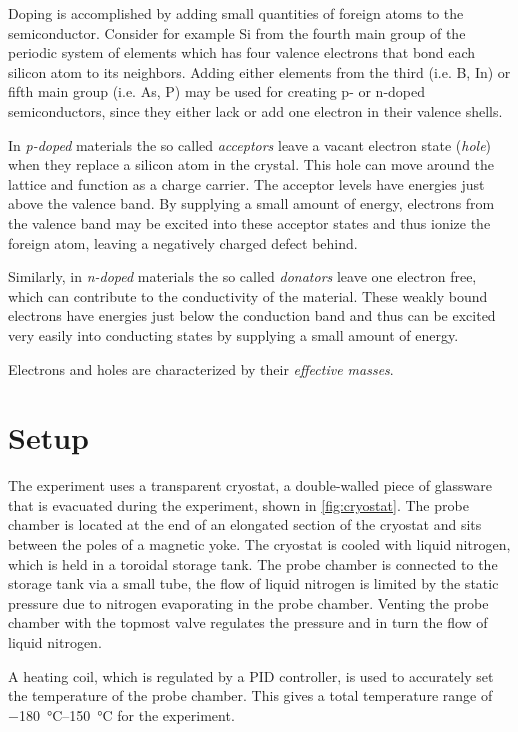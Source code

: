 Doping is accomplished by adding small quantities of foreign atoms to the semiconductor.
Consider for example Si from the fourth main group of the periodic system of elements which has four valence electrons that bond each silicon atom to its neighbors.
Adding either elements from the third (i.e. B, In) or fifth main group (i.e. As, P) may be used for creating p- or n-doped semiconductors, since they either lack or add one electron in their valence shells.

In \textit{p-doped} materials the so called \textit{acceptors} leave a vacant electron state (\textit{hole}) when they replace a silicon atom in the crystal.
This hole can move around the lattice and function as a charge carrier.
The acceptor levels have energies just above the valence band.
By supplying a small amount of energy, electrons from the valence band may be excited into these acceptor states and thus ionize the foreign atom, leaving a negatively charged defect behind.

Similarly, in \textit{n-doped} materials the so called \textit{donators} leave one electron free, which can contribute to the conductivity of the material.
These weakly bound electrons have energies just below the conduction band and thus can be excited very easily into conducting states by supplying a small amount of energy.

Electrons and holes are characterized by their \textit{effective masses}.
\section{Setup}
The experiment uses a transparent cryostat, a double-walled piece of glassware that is evacuated during the experiment, shown in \autoref{fig:cryostat}.
The probe chamber is located at the end of an elongated section of the cryostat and sits between the poles of a magnetic yoke.
The cryostat is cooled with liquid nitrogen, which is held in a toroidal storage tank.
The probe chamber is connected to the storage tank via a small tube, the flow of liquid nitrogen is limited by the static pressure due to nitrogen evaporating in the probe chamber.
Venting the probe chamber with the topmost valve regulates the pressure and in turn the flow of liquid nitrogen.

A heating coil, which is regulated by a PID controller, is used to accurately set the temperature of the probe chamber.
This gives a total temperature range of \SIrange{-180}{150}{\celsius} for the experiment.

